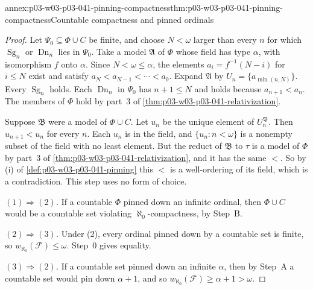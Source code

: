\begin{annexitem}{annex:p03-w03-p03-041-pinning-compactness}{thm:p03-w03-p03-041-pinning-compactness}{Countable compactness and pinned ordinals}
\begin{proof}
Let \(\Psi_0\subseteq\Phi\cup C\) be finite, and choose \(N<\omega\) larger
than every \(n\) for which \(\operatorname{Sg}_n\) or
\(\operatorname{Dn}_n\) lies in \(\Psi_0\). Take a model \(\mathfrak A\)
of \(\Phi\) whose field has type \(\alpha\), with isomorphism \(f\) onto
\(\alpha\). Since \(N<\omega\leq\alpha\), the elements
\(a_i=f^{-1}(N-i)\) for \(i\leq N\) exist and satisfy
\(a_N<a_{N-1}<\cdots<a_0\). Expand \(\mathfrak A\) by
\(U_n=\{a_{\min(n,N)}\}\). Every \(\operatorname{Sg}_n\) holds. Each
\(\operatorname{Dn}_n\) in \(\Psi_0\) has \(n+1\leq N\) and holds because
\(a_{n+1}<a_n\). The members of \(\Phi\) hold by part~3 of
\cref{thm:p03-w03-p03-041-relativization}.

Suppose \(\mathfrak B\) were a model of \(\Phi\cup C\). Let \(u_n\) be the
unique element of \(U_n^{\mathfrak B}\). Then \(u_{n+1}<u_n\) for every
\(n\). Each \(u_n\) is in the field, and \(\{u_n:n<\omega\}\) is a
nonempty subset of the field with no least element. But the reduct of
\(\mathfrak B\) to \(\tau\) is a model of \(\Phi\) by part~3 of
\cref{thm:p03-w03-p03-041-relativization}, and it has the same \(<\). So
by (i) of \cref{def:p03-w03-p03-041-pinning} this \(<\) is a
well-ordering of its field, which is a contradiction. This step uses no
form of choice.

\emph{\((1)\Rightarrow(2)\).} If a countable \(\Phi\) pinned down an
infinite ordinal, then \(\Phi\cup C\) would be a countable set violating
\(\aleph_0\)-compactness, by Step~B.

\emph{\((2)\Rightarrow(3)\).} Under (2), every ordinal pinned down by a
countable set is finite, so \(w_{\aleph_0}(\mathcal F)\leq\omega\). Step~0
gives equality.

\emph{\((3)\Rightarrow(2)\).} If a countable set pinned down an infinite
\(\alpha\), then by Step~A a countable set would pin down \(\alpha+1\), and
so \(w_{\aleph_0}(\mathcal F)\geq\alpha+1>\omega\).


\end{proof}
\end{annexitem}
